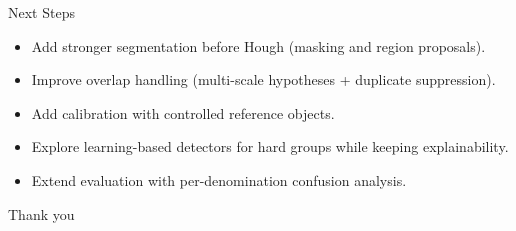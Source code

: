 \documentclass[aspectratio=169]{beamer}
\begin{document}
\begin{frame}{Next Steps}
  \begin{itemize}
    \item Add stronger segmentation before Hough (masking and region proposals).
    \item Improve overlap handling (multi-scale hypotheses + duplicate suppression).
    \item Add calibration with controlled reference objects.
    \item Explore learning-based detectors for hard groups while keeping explainability.
    \item Extend evaluation with per-denomination confusion analysis.
  \end{itemize}
\end{frame}

\begin{frame}
  \centering
  \Large Thank you
\end{frame}
\end{document}
